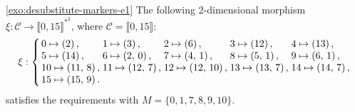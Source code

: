 \documentclass[12pt]{amsart}
\newcommand{\Ccal}{\mathcal{C}}
\newcommand{\Zrange}[1]{\llbracket0,#1\rrbracket}
\begin{document}
\begin{exosolution}{\ref{exo:desubstitute-markers-e1}}
The following 2-dimensional morphism $\xi:\Ccal\to\Zrange{15}^{*^2}$,
where $\Ccal=\Zrange{15}$:
    \[
        \xi:\left\{
            {\arraycolsep=1.4pt
            \begin{array}{lllll}
                0\mapsto \left(2\right)
                ,&
                1\mapsto \left(3\right)
                ,&
                2\mapsto \left(6\right)
                ,&
                3\mapsto \left(12\right)
                ,&
                4\mapsto \left(13\right)
                ,\\
                5\mapsto \left(14\right)
                ,&
                6\mapsto \left(2,\,0\right)
                ,&
                7\mapsto \left(4,\,1\right)
                ,&
                8\mapsto \left(5,\,1\right)
                ,&
                9\mapsto \left(6,\,1\right)
                ,\\
                10\mapsto \left(11,\,8\right)
                ,&
                11\mapsto \left(12,\,7\right)
                ,&
                12\mapsto \left(12,\,10\right)
                ,&
                13\mapsto \left(13,\,7\right)
                ,&
                14\mapsto \left(14,\,7\right)
                ,\\
                15\mapsto \left(15,\,9\right)
                .
            \end{array}
            }
    \right.
    \] satisfies the requirements
    with $M=\{0, 1, 7, 8, 9, 10\}$.
\end{exosolution}
\end{document}
